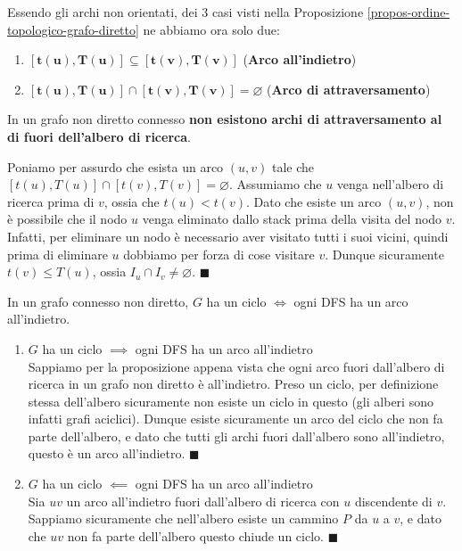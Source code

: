 \documentclass[11pt, a4paper, titlepage, oneside]{scrbook}
\begin{document}
Essendo gli archi non orientati, dei 3 casi visti nella Proposizione \ref{propos-ordine-topologico-grafo-diretto} ne abbiamo ora solo due:
\begin{enumerate}
    \item $\bm{[t(u), T(u)] \subseteq [t(v), T(v)]}$ (\textbf{Arco all'indietro})
    \item $\bm{[t(u), T(u)] \cap [t(v), T(v)] = \varnothing}$ (\textbf{Arco di attraversamento})
\end{enumerate}

\begin{Proposizione}[]
\label{propos-grafi-non-diretti-ordine-topologico}
In un grafo non diretto connesso \textbf{non esistono archi di attraversamento al di fuori dell'albero di ricerca}.
\end{Proposizione}

\Dimostrazione \nopagebreak

Poniamo per assurdo che esista un arco $(u,v)$ tale che $[t(u), T(u)]\cap[t(v), T(v)] = \varnothing$. Assumiamo che $u$ venga nell'albero di ricerca prima di $v$, ossia che $t(u) < t(v)$. Dato che esiste un arco $(u,v)$, non è possibile che il nodo $u$ venga eliminato dallo stack prima della visita del nodo $v$. Infatti, per eliminare un nodo è necessario aver visitato tutti i suoi vicini, quindi prima di eliminare $u$ dobbiamo per forza di cose visitare $v$. Dunque sicuramente $t(v) \leq T(u)$, ossia $I_u \cap I_v \neq \varnothing$. $\blacksquare$

\begin{Proposizione}[]
\label{propos-grafo-connesso-non-diretto-ciclo-arco-all-indietro}
In un grafo connesso non diretto, $G$ ha un ciclo $\iff$ ogni DFS ha un arco all'indietro.
\end{Proposizione}

\Dimostrazione \nopagebreak

\begin{enumerate}[label=\arabic*°]
    \item $G$ ha un ciclo $\implies$ ogni DFS ha un arco all'indietro \\
    Sappiamo per la proposizione appena vista che ogni arco fuori dall'albero di ricerca in un grafo non diretto è all'indietro. Preso un ciclo, per definizione stessa dell'albero sicuramente non esiste un ciclo in questo (gli alberi sono infatti grafi aciclici). Dunque esiste sicuramente un arco del ciclo che non fa parte dell'albero, e dato che tutti gli archi fuori dall'albero sono all'indietro, questo è un arco all'indietro. $\blacksquare$
    \item $G$ ha un ciclo $\impliedby$ ogni DFS ha un arco all'indietro \\
    Sia $uv$ un arco all'indietro fuori dall'albero di ricerca con $u$ discendente di $v$. Sappiamo sicuramente che nell'albero esiste un cammino $P$ da $u$ a $v$, e dato che $uv$ non fa parte dell'albero questo chiude un ciclo. $\blacksquare$
\end{enumerate}
\end{document}
